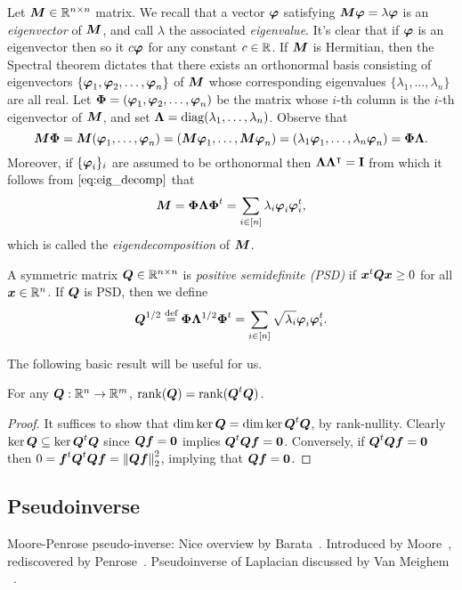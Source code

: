 Let ${\vb*{M}}\in\mathbb{R}^{n\times n}$ matrix. We recall that a vector $\vb*{\varphi}$ satisfying ${\vb*{M}}\vb*{\varphi}=\lambda\vb*{\varphi}$ is an \emph{eigenvector} of ${\vb*{M}}$, and call $\lambda$ the associated \emph{eigenvalue}. It's clear that if $\vb*{\varphi}$ is an eigenvector then so it $c\vb*{\varphi}$ for any constant $c\in \mathbb{R}$. If ${\vb*{M}}$ is Hermitian, then the Spectral theorem dictates that there exists an orthonormal basis consisting of eigenvectors $\{\vb*{\varphi}_1,\vb*{\varphi}_2,\dots,\vb*{\varphi}_n\}$ of ${\vb*{M}}$ whose corresponding eigenvalues $\{\lambda_1,\dots,\lambda_n\}$ are all real. Let $\boldsymbol{\Phi}=(\vb*{\varphi}_1,\vb*{\varphi}_2,\dots,\vb*{\varphi}_n)$ be the matrix whose $i$-th column is the $i$-th eigenvector of ${\vb*{M}}$, and set $\vb{\Lambda}=\text{diag}(\lambda_1,\dots,\lambda_n)$. Observe that 
\begin{equation}
\label{eq:eig_decomp}
{\vb*{M}}\boldsymbol{\Phi}={\vb*{M}}(\vb*{\varphi}_1,\dots,\vb*{\varphi}_n)=({\vb*{M}}\vb*{\varphi}_1,\dots,{\vb*{M}}\vb*{\varphi}_n)=(\lambda_1\vb*{\varphi}_1,\dots,\lambda_n\vb*{\varphi}_n)=\boldsymbol{\Phi}\vb{\Lambda}.
\end{equation}
Moreover, if $\{\vb*{\varphi}_i\}_i$ are assumed to be orthonormal then $\vb{\Lambda}\vb{\Lambda}^\intercal=\vb{I}$ from which it follows from $\eqref{eq:eig_decomp}$ that \begin{equation}
    \label{eq:eig_decomp2}
    {\vb*{M}}=\boldsymbol{\Phi}\vb{\Lambda}\boldsymbol{\Phi}^t = \sum_{i\in[n]}\lambda_i\vb*{\varphi}_i\vb*{\varphi}_i^t,
\end{equation}
which is called the \emph{eigendecomposition} of ${\vb*{M}}$. 

A symmetric matrix $\vb*{Q}\in\mathbb{R}^{n\times n}$ is \emph{positive semidefinite (PSD)} if $\vb*{x}^t\vb*{Q}\vb*{x} \geq 0$ for all $\vb*{x}\in\mathbb{R}^n$. If $\vb*{Q}$ is PSD, then we define 
\begin{equation*}
    \vb*{Q}^{1/2} \overset{\text{def}}{=} \boldsymbol{\Phi}\vb{\Lambda}^{1/2}\boldsymbol{\Phi}^t = \sum_{i\in[n]}\sqrt{\lambda_i}\vb*{\varphi}_i\vb*{\varphi}_i^t.
\end{equation*}

The following basic result will be useful for us. 

\begin{lemma}
	\label{lem:rank(QtQ)}
	For any $\vb*{Q}:\mathbb{R}^n\to\mathbb{R}^m$, $\rank(\vb*{Q}) = \rank(\vb*{Q}^t\vb*{Q})$. 
\end{lemma}
\begin{proof}
	It suffices to show that $\dim\ker\vb*{Q} = \dim\ker\vb*{Q}^t \vb*{Q}$, by rank-nullity. Clearly $\ker\vb*{Q} \subseteq \ker\vb*{Q}^t\vb*{Q}$ since $\vb*{Q}\vb*{f}=\vb{0}$ implies $\vb*{Q}^t\vb*{Q}\vb*{f}=\vb{0}$. Conversely, if $\vb*{Q}^t\vb*{Q}\vb*{f}=\vb{0}$ then $0=\vb*{f}^t \vb*{Q}^t \vb*{Q}\vb*{f} = \norm{\vb*{Q}\vb*{f}}_2^2$, implying that $\vb*{Q}\vb*{f}=\vb{0}$.  
\end{proof}

\subsection{Pseudoinverse}
\label{sec:background_pseudoinverse}
Moore-Penrose pseudo-inverse: Nice overview by Barata~\cite{barata2012moore}. Introduced by Moore~\cite{moore1920reciprocal}, rediscovered by Penrose~\cite{penrose1955generalized,penrose1956best}. Pseudoinverse of Laplacian discussed by Van Meighem \etal~\cite{van2017pseudoinverse}. 

